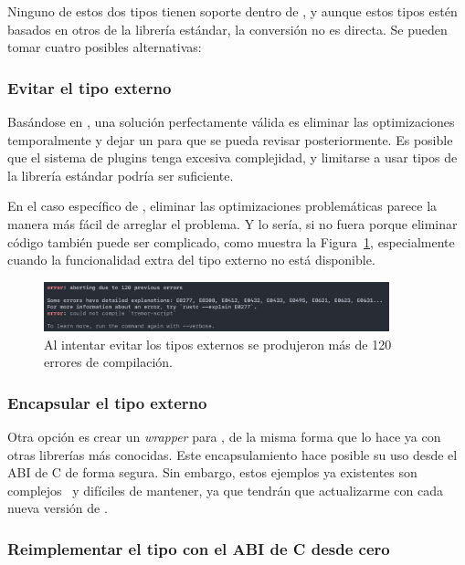 Ninguno de estos dos tipos tienen soporte dentro de \abistable, y aunque estos
tipos estén basados en otros de la librería estándar, la conversión no es
directa. Se pueden tomar cuatro posibles alternativas:

\subsubsection{Evitar el tipo externo}

Basándose en \work, una solución perfectamente válida es eliminar las
optimizaciones temporalmente y dejar un  para que se pueda revisar
posteriormente. Es posible que el sistema de plugins tenga excesiva complejidad,
y limitarse a usar tipos de la librería estándar podría ser suficiente.

En el caso específico de , eliminar las optimizaciones problemáticas
parece la manera más fácil de arreglar el problema. Y lo sería, si no fuera
porque eliminar código también puede ser complicado, como muestra la
Figura~\ref{fig:errors}, especialmente cuando la funcionalidad extra del tipo
externo no está disponible.

\begin{figure}
    \centering
    \includegraphics[width=10cm]{./Imagenes/errors.png}
    \caption{Al intentar evitar los tipos externos se produjeron más de 120
    errores de compilación.}%
    \label{fig:errors}
\end{figure}

\subsubsection{Encapsular el tipo externo}

Otra opción es crear un \emph{wrapper} para , de la misma forma
que lo hace ya \abistable con otras librerías más conocidas. Este
encapsulamiento hace posible su uso desde el ABI de C de forma segura. Sin
embargo, estos ejemplos ya existentes son complejos~\cite{complexwrapper} y
difíciles de mantener, ya que tendrán que actualizarme con cada nueva versión de
.

\subsubsection{Reimplementar el tipo con el ABI de C desde cero}

